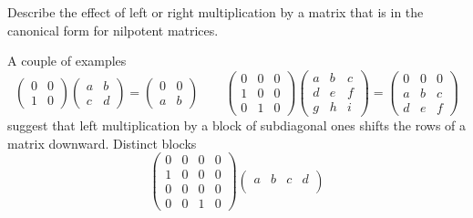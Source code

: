 \begin{exercises}
\begin{answer}
\begin{exparts*}
      \end{exparts*}  
     \end{answer}
  \item 
    Describe the effect of left or right multiplication by a matrix that is
    in the canonical form for nilpotent matrices.
    \begin{answer}
      A couple of examples 
      \begin{equation*}
        \begin{pmatrix}
          0  &0  \\
          1  &0
        \end{pmatrix}
        \begin{pmatrix}
          a  &b  \\
          c  &d
        \end{pmatrix}
        =
        \begin{pmatrix}
          0  &0  \\
          a  &b  
        \end{pmatrix}
        \qquad
        \begin{pmatrix}
          0  &0  &0 \\
          1  &0  &0 \\
          0  &1  &0
        \end{pmatrix}
        \begin{pmatrix}
          a  &b  &c \\
          d  &e  &f \\
          g  &h  &i
        \end{pmatrix}
        =
        \begin{pmatrix}
          0  &0  &0 \\
          a  &b  &c \\
          d  &e  &f
        \end{pmatrix}
      \end{equation*}
      suggest that left multiplication by a block of subdiagonal ones
      shifts the rows of a matrix downward.
      Distinct blocks
      \begin{equation*}
        \begin{pmatrix}
          0  &0  &0  &0  \\
          1  &0  &0  &0  \\
          0  &0  &0  &0  \\
          0  &0  &1  &0
        \end{pmatrix}
        \begin{pmatrix}
          a  &b  &c  &d  \\

\end{pmatrix}
\end{equation*}
\end{answer}
\end{exercises}
